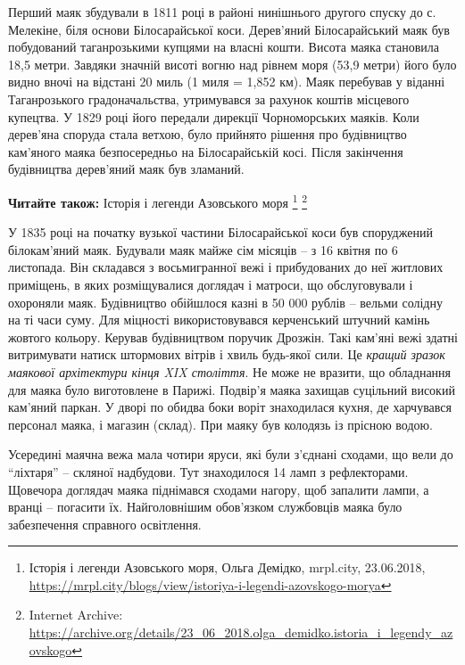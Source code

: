 
Перший маяк збудували в 1811 році в районі нинішнього другого спуску до с.
Мелекіне, біля основи Білосарайської коси. Дерев'яний Білосарайський маяк був
побудований таганрозькими купцями на власні кошти. Висота маяка становила 18,5
метри. Завдяки значній висоті вогню над рівнем моря (53,9 метри) його було
видно вночі на відстані 20 миль (1 миля = 1,852 км). Маяк перебував у віданні
Таганрозького градоначальства, утримувався за рахунок коштів місцевого
купецтва. У 1829 році його передали дирекції Чорноморських маяків. Коли
дерев'яна споруда стала ветхою, було прийнято рішення про будівництво кам'яного
маяка безпосередньо на Білосарайській косі. Після закінчення будівництва
дерев'яний маяк був зламаний.

\textbf{Читайте також:} Історія і легенди Азовського моря
\footnote{Історія і легенди Азовського моря, Ольга Демідко, mrpl.city,
23.06.2018, \url{https://mrpl.city/blogs/view/istoriya-i-legendi-azovskogo-morya}}
\footnote{Internet Archive: \url{https://archive.org/details/23_06_2018.olga_demidko.istoria_i_legendy_azovskogo}}

У 1835 році на початку вузької частини Білосарайської коси був споруджений
білокам'яний маяк. Будували маяк майже сім місяців – з 16 квітня по 6
листопада. Він складався з восьмигранної вежі і прибудованих до неї житлових
приміщень, в яких розміщувалися доглядач і матроси, що обслуговували і
охороняли маяк. Будівництво обійшлося казні в 50 000 рублів – вельми солідну на
ті часи суму. Для міцності використовувався керченський штучний камінь жовтого
кольору. Керував будівництвом поручик Дрозжін. Такі кам'яні вежі здатні
витримувати натиск штормових вітрів і хвиль будь-якої сили. Це \emph{кращий зразок
маякової архітектури кінця XIX століття}. Не може не вразити, що обладнання для
маяка було виготовлене в Парижі. Подвір'я маяка захищав суцільний високий
кам'яний паркан. У дворі по обидва боки воріт знаходилася кухня, де харчувався
персонал маяка, і магазин (склад). При маяку був колодязь із прісною водою.


Усередині маячна вежа мала чотири яруси, які були з'єднані сходами, що вели до
\enquote{ліхтаря} – скляної надбудови. Тут знаходилося 14 ламп з рефлекторами. Щовечора
доглядач маяка піднімався сходами нагору, щоб запалити лампи, а вранці –
погасити їх. Найголовнішим обов'язком службовців маяка було забезпечення
справного освітлення.

